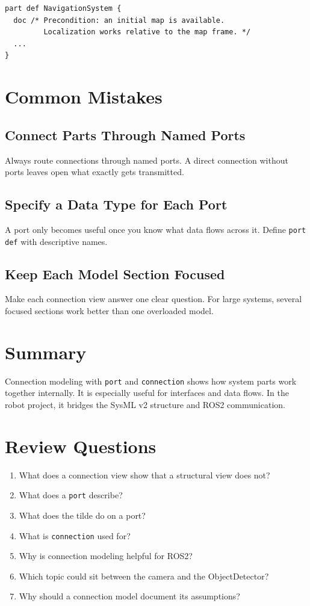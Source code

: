 \begin{lstlisting}
part def NavigationSystem {
  doc /* Precondition: an initial map is available.
         Localization works relative to the map frame. */
  ...
}
\end{lstlisting}

\section{Common Mistakes}
\subsection{Connect Parts Through Named Ports}
Always route connections through named ports. A direct connection without ports leaves open what exactly gets transmitted.

\subsection{Specify a Data Type for Each Port}
A port only becomes useful once you know what data flows across it. Define \texttt{port def} with descriptive names.

\subsection{Keep Each Model Section Focused}
Make each connection view answer one clear question. For large systems, several focused sections work better than one overloaded model.

\section{Summary}
Connection modeling with \texttt{port} and \texttt{connection} shows how system parts work together internally. It is especially useful for interfaces and data flows. In the robot project, it bridges the SysML v2 structure and ROS2 communication.

\section{Review Questions}
\begin{enumerate}
    \item What does a connection view show that a structural view does not?
    \item What does a \texttt{port} describe?
    \item What does the tilde do on a port?
    \item What is \texttt{connection} used for?
    \item Why is connection modeling helpful for ROS2?
    \item Which topic could sit between the camera and the ObjectDetector?
    \item Why should a connection model document its assumptions?
\end{enumerate}

